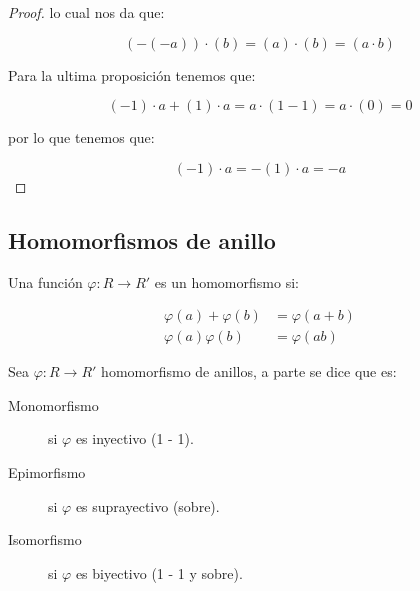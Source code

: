 \begin{proof}
            lo cual nos da que:

            \begin{equation*}
                (-(-a)) \cdot (b) = (a) \cdot (b) = (a \cdot b)
            \end{equation*}

            Para la ultima proposición tenemos que:

            \begin{equation*}
                (-1) \cdot a + (1) \cdot a = a \cdot (1 - 1) = a \cdot (0) = 0 
            \end{equation*}

            por lo que tenemos que:

            \begin{equation*}
                (-1) \cdot a = -(1) \cdot a = -a
            \end{equation*}
        \end{proof}


    \newpage
    \subsection{Homomorfismos de anillo}

        \begin{definicion}
            Una función $\varphi \colon R \to R'$ es un homomorfismo si:

            \begin{align}
                \varphi(a) + \varphi(b) &= \varphi(a + b) \\
                \varphi(a) \varphi(b) &= \varphi(ab)
            \end{align}
        \end{definicion}

        \begin{definicion}
            Sea $\varphi \colon R \to R'$ homomorfismo de anillos, a parte se dice que es:

            \begin{description}
                \item[Monomorfismo] si $\varphi$ es inyectivo (1 - 1).
                \item[Epimorfismo] si $\varphi$ es suprayectivo (sobre).
                \item[Isomorfismo] si $\varphi$ es biyectivo (1 - 1 y sobre).
            \end{description}
        \end{definicion}

